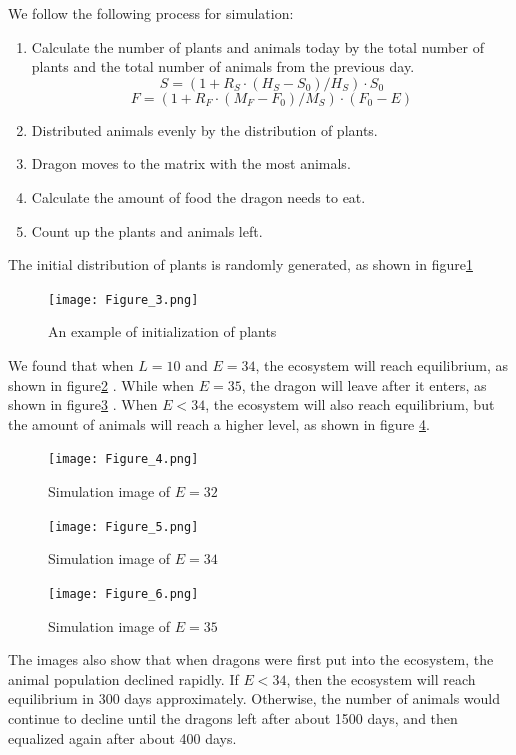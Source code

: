 \documentclass{mcmthesis}
\begin{document}
We follow the following process for simulation:
\begin{enumerate}
    \item Calculate the number of plants and animals today by the total number of plants and the total number of animals from the previous day.
    \begin{equation}
        S=(1+R_{S}\cdot (H_{S}-S_{0})/H_{S})\cdot S_{0}
    \end{equation}
    \begin{equation}
        F=(1+R_{F}\cdot (M_{F}-F_{0})/M_{S})\cdot (F_{0}-E)
    \end{equation}
    \item Distributed animals evenly by the distribution of plants.
    \item Dragon moves to the matrix with the most animals.
    \item Calculate the amount of food the dragon needs to eat.
    \item Count up the plants and animals left.
\end{enumerate}

The initial distribution of plants is randomly generated, as shown in figure\ref{fig:simulate2}
\begin{figure}[h]
    \centering
    \texttt{[image: Figure\_3.png]}
    \caption{An example of initialization of plants}\label{fig:simulate2}
\end{figure}

We found that when $L = 10$ and $E = 34$, the ecosystem will reach equilibrium, as shown in figure\ref{fig:simulate3} . While when $E = 35$, the dragon will leave after it enters, as shown in figure\ref{fig:simulate4} . When $E < 34$, the ecosystem will also reach equilibrium, but the amount of animals will reach a higher level, as shown in figure \ref{fig:simulate5}.\\

\begin{figure}[h]
    \centering
    \texttt{[image: Figure\_4.png]}
    \caption{Simulation image of $E=32$}\label{fig:simulate3}
\end{figure}
\begin{figure}[t]
    \centering
    \texttt{[image: Figure\_5.png]}
    \caption{Simulation image of $E=34$}\label{fig:simulate4}
\end{figure}
\begin{figure}[t]
    \centering
    \texttt{[image: Figure\_6.png]}
    \caption{Simulation image of $E=35$}\label{fig:simulate5}
\end{figure}
The images also show that when dragons were first put into the ecosystem, the animal population declined rapidly. If $E<34$, then the ecosystem will reach equilibrium in 300 days approximately. Otherwise, the number of animals would continue to decline until the dragons left after about 1500 days, and then equalized again after about 400 days.
\end{document}
